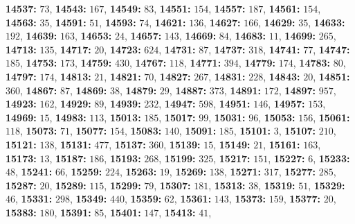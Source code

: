 \textsf{\bfseries 14537:} $73$, \textsf{\bfseries 14543:} $167$, \textsf{\bfseries 14549:} $83$, \textsf{\bfseries 14551:} $154$, \textsf{\bfseries 14557:} $187$, \textsf{\bfseries 14561:} $154$, \textsf{\bfseries 14563:} $35$, \textsf{\bfseries 14591:} $51$, \textsf{\bfseries 14593:} $74$, \textsf{\bfseries 14621:} $136$, \textsf{\bfseries 14627:} $166$, \textsf{\bfseries 14629:} $35$, \textsf{\bfseries 14633:} $192$, \textsf{\bfseries 14639:} $163$, \textsf{\bfseries 14653:} $24$, \textsf{\bfseries 14657:} $143$, \textsf{\bfseries 14669:} $84$, \textsf{\bfseries 14683:} $11$, \textsf{\bfseries 14699:} $265$, \textsf{\bfseries 14713:} $135$, \textsf{\bfseries 14717:} $20$, \textsf{\bfseries 14723:} $624$, \textsf{\bfseries 14731:} $87$, \textsf{\bfseries 14737:} $318$, \textsf{\bfseries 14741:} $77$, \textsf{\bfseries 14747:} $185$, \textsf{\bfseries 14753:} $173$, \textsf{\bfseries 14759:} $430$, \textsf{\bfseries 14767:} $118$, \textsf{\bfseries 14771:} $394$, \textsf{\bfseries 14779:} $174$, \textsf{\bfseries 14783:} $80$, \textsf{\bfseries 14797:} $174$, \textsf{\bfseries 14813:} $21$, \textsf{\bfseries 14821:} $70$, \textsf{\bfseries 14827:} $267$, \textsf{\bfseries 14831:} $228$, \textsf{\bfseries 14843:} $20$, \textsf{\bfseries 14851:} $360$, \textsf{\bfseries 14867:} $87$, \textsf{\bfseries 14869:} $38$, \textsf{\bfseries 14879:} $29$, \textsf{\bfseries 14887:} $373$, \textsf{\bfseries 14891:} $172$, \textsf{\bfseries 14897:} $957$, \textsf{\bfseries 14923:} $162$, \textsf{\bfseries 14929:} $89$, \textsf{\bfseries 14939:} $232$, \textsf{\bfseries 14947:} $598$, \textsf{\bfseries 14951:} $146$, \textsf{\bfseries 14957:} $153$, \textsf{\bfseries 14969:} $15$, \textsf{\bfseries 14983:} $113$, \textsf{\bfseries 15013:} $185$, \textsf{\bfseries 15017:} $99$, \textsf{\bfseries 15031:} $96$, \textsf{\bfseries 15053:} $156$, \textsf{\bfseries 15061:} $118$, \textsf{\bfseries 15073:} $71$, \textsf{\bfseries 15077:} $154$, \textsf{\bfseries 15083:} $140$, \textsf{\bfseries 15091:} $185$, \textsf{\bfseries 15101:} $3$, \textsf{\bfseries 15107:} $210$, \textsf{\bfseries 15121:} $138$, \textsf{\bfseries 15131:} $477$, \textsf{\bfseries 15137:} $360$, \textsf{\bfseries 15139:} $15$, \textsf{\bfseries 15149:} $21$, \textsf{\bfseries 15161:} $163$, \textsf{\bfseries 15173:} $13$, \textsf{\bfseries 15187:} $186$, \textsf{\bfseries 15193:} $268$, \textsf{\bfseries 15199:} $325$, \textsf{\bfseries 15217:} $151$, \textsf{\bfseries 15227:} $6$, \textsf{\bfseries 15233:} $48$, \textsf{\bfseries 15241:} $66$, \textsf{\bfseries 15259:} $224$, \textsf{\bfseries 15263:} $19$, \textsf{\bfseries 15269:} $138$, \textsf{\bfseries 15271:} $317$, \textsf{\bfseries 15277:} $285$, \textsf{\bfseries 15287:} $20$, \textsf{\bfseries 15289:} $115$, \textsf{\bfseries 15299:} $79$, \textsf{\bfseries 15307:} $181$, \textsf{\bfseries 15313:} $38$, \textsf{\bfseries 15319:} $51$, \textsf{\bfseries 15329:} $46$, \textsf{\bfseries 15331:} $298$, \textsf{\bfseries 15349:} $440$, \textsf{\bfseries 15359:} $62$, \textsf{\bfseries 15361:} $143$, \textsf{\bfseries 15373:} $159$, \textsf{\bfseries 15377:} $20$, \textsf{\bfseries 15383:} $180$, \textsf{\bfseries 15391:} $85$, \textsf{\bfseries 15401:} $147$, \textsf{\bfseries 15413:} $41$, 

